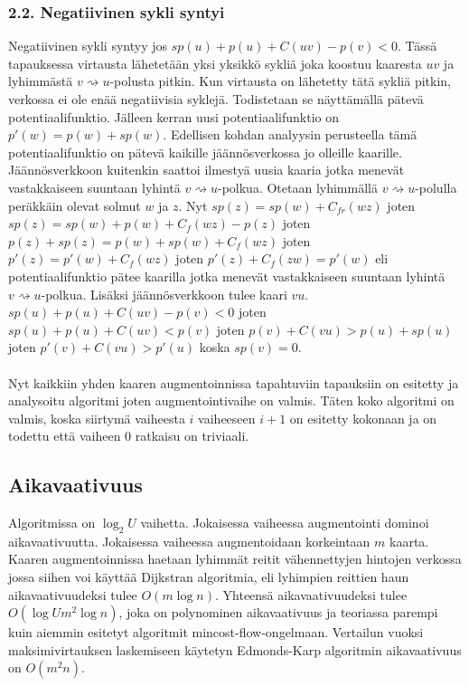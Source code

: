 \documentclass[a4paper, 11pt]{article}
\begin{document}
\subsubsection*{2.2. Negatiivinen sykli syntyi}
Negatiivinen sykli syntyy jos $sp(u) + p(u) + C(uv) - p(v) < 0$. Tässä tapauksessa 
virtausta lähetetään yksi yksikkö sykliä joka koostuu kaaresta $uv$ ja lyhimmästä
$v \rightsquigarrow u$-polusta pitkin. Kun virtausta on lähetetty tätä sykliä
pitkin, verkossa ei ole enää negatiivisia syklejä. Todistetaan se näyttämällä pätevä
potentiaalifunktio. Jälleen kerran uusi potentiaalifunktio on $p'(w) = p(w) + sp(w)$.
Edellisen kohdan analyysin perusteella tämä potentiaalifunktio on pätevä kaikille 
jäännösverkossa jo olleille kaarille. Jäännösverkkoon kuitenkin saattoi ilmestyä
uusia kaaria jotka menevät vastakkaiseen suuntaan lyhintä $v \rightsquigarrow u$-polkua.
Otetaan lyhimmällä $v \rightsquigarrow u$-polulla peräkkäin olevat solmut $w$ ja $z$.
Nyt $sp(z) = sp(w) + C_{fr}(wz)$ joten $sp(z) = sp(w) + p(w) + C_f(wz) - p(z)$ joten
$p(z) + sp(z) = p(w) + sp(w) + C_f(wz)$ joten $p'(z) = p'(w) + C_f(wz)$ joten 
$p'(z) + C_f(zw) = p'(w)$ eli potentiaalifunktio pätee kaarilla jotka menevät 
vastakkaiseen suuntaan lyhintä $v \rightsquigarrow u$-polkua. Lisäksi jäännösverkkoon
tulee kaari $vu$. $sp(u) + p(u) + C(uv) - p(v) < 0$ joten 
$sp(u) + p(u) + C(uv) < p(v)$ joten $p(v) + C(vu) > p(u) + sp(u)$ joten
$p'(v) + C(vu) > p'(u)$ koska $sp(v) = 0$.
\\\\
\noindent
Nyt kaikkiin yhden kaaren augmentoinnissa tapahtuviin tapauksiin on esitetty ja analysoitu
algoritmi joten augmentointivaihe on valmis. Täten koko algoritmi on valmis, koska siirtymä
vaiheesta $i$ vaiheeseen $i+1$ on esitetty kokonaan ja on todettu että vaiheen 0 ratkaisu
on triviaali.
\subsection*{Aikavaativuus}
Algoritmissa on $\log_2 U$ vaihetta. Jokaisessa vaiheessa augmentointi dominoi aikavaativuutta.
Jokaisessa vaiheessa augmentoidaan korkeintaan
$m$ kaarta. Kaaren augmentoinnissa haetaan lyhimmät reitit vähennettyjen hintojen
verkossa jossa siihen voi käyttää Dijkstran algoritmia, eli lyhimpien reittien haun
aikavaativuudeksi tulee $O(m \log n)$. Yhteensä aikavaativuudeksi tulee $O(\log U m^2 \log n)$, joka
on polynominen aikavaativuus ja teoriassa parempi kuin aiemmin esitetyt algoritmit mincost-flow-ongelmaan.
Vertailun vuoksi maksimivirtauksen laskemiseen käytetyn Edmonds-Karp algoritmin aikavaativuus
on $O(m^2n)$.
\end{document}

